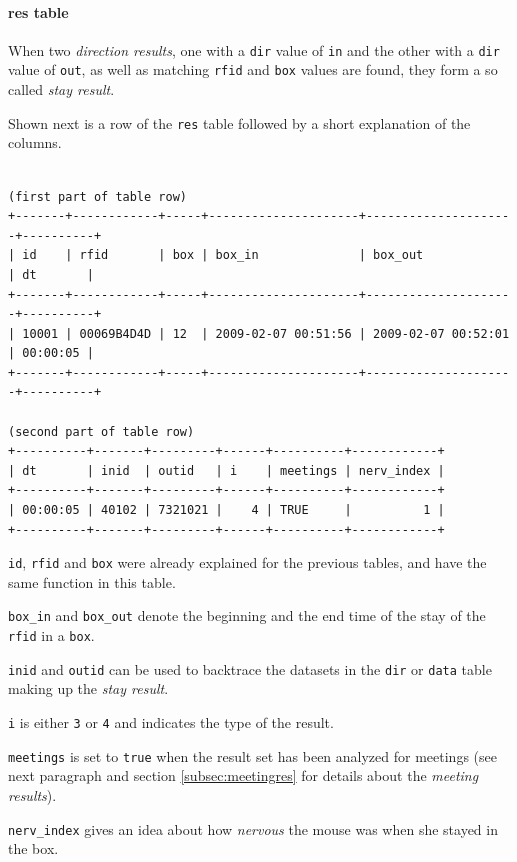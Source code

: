 \paragraph{res table}
\label{para:res_table}

When two \textit{direction results}, one with a \lstinline|dir| value of \lstinline|in| and the other with a \lstinline|dir| value of \lstinline|out|, as well as matching \lstinline|rfid| and \lstinline|box| values are found, they form a so called \textit{stay result}.

Shown next is a row of the \lstinline|res| table followed by a short explanation of the columns.

\codescript
\begin{lstlisting}[frame=none]

(first part of table row)
+-------+------------+-----+---------------------+---------------------+----------+
| id    | rfid       | box | box_in              | box_out             | dt       |
+-------+------------+-----+---------------------+---------------------+----------+
| 10001 | 00069B4D4D | 12  | 2009-02-07 00:51:56 | 2009-02-07 00:52:01 | 00:00:05 |
+-------+------------+-----+---------------------+---------------------+----------+

(second part of table row)
+----------+-------+---------+------+----------+------------+
| dt       | inid  | outid   | i    | meetings | nerv_index |
+----------+-------+---------+------+----------+------------+
| 00:00:05 | 40102 | 7321021 |    4 | TRUE     |          1 | 
+----------+-------+---------+------+----------+------------+

\end{lstlisting}

\begin{mydesc}
	\item \lstinline|id|, \lstinline|rfid| and \lstinline|box| were already explained for the previous tables, and have the same function in this table.
	\item \lstinline|box_in| and \lstinline|box_out| denote the beginning and the end time of the stay of the \lstinline|rfid| in a \lstinline|box|.
	 \item \lstinline|inid| and \lstinline|outid| can be used to backtrace the datasets in the \lstinline|dir| or \lstinline|data| table making up the \textit{stay result}.
	 \item \lstinline|i| is either \lstinline|3| or \lstinline|4| and indicates the type of the result.
	 \item \lstinline|meetings| is set to \lstinline|true| when the result set has been analyzed for meetings (see next paragraph and section \ref{subsec:meetingres} for details about the \textit{meeting results}).
	 \item \lstinline|nerv_index| gives an idea about how \textit{nervous} the mouse was when she stayed in the box. 
\end{mydesc}

